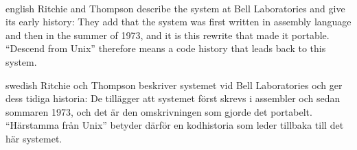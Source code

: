 \paragraph{} %
\begin{onlyin}{english} %
Ritchie and Thompson describe the system at Bell Laboratories and give
its early history:
They add that the system was first written in assembly language and
then  in the summer of
1973, and it is this rewrite that made it portable.
\enquote{Descend from Unix} therefore means a code history that leads
back to this system.
\end{onlyin}
\begin{onlyin}{swedish}
Ritchie och Thompson beskriver systemet vid Bell Laboratories och ger
dess tidiga historia:
De tillägger att systemet först skrevs i assembler och sedan
sommaren 1973, och det är den omskrivningen som gjorde det portabelt.
\enquote{Härstamma från Unix} betyder därför en kodhistoria som leder
tillbaka till det här systemet.
\end{onlyin}

